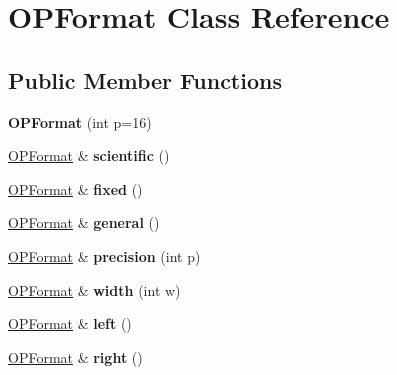 \hypertarget{classOPFormat}{}\section{O\+P\+Format Class Reference}
\label{classOPFormat}
\subsection*{Public Member Functions}
\begin{DoxyCompactItemize}
\item 
\mbox{\label{classOPFormat_a5eccf80a23c37888280f2b7f1f682105}} 
{\bfseries O\+P\+Format} (int p=16)
\item 
\mbox{\label{classOPFormat_a222296f5ecbac5d21f7c63cec2dd7e24}} 
\hyperlink{classOPFormat}{O\+P\+Format} \& {\bfseries scientific} ()
\item 
\mbox{\label{classOPFormat_a6459872d512dbf36edea3a48bb61fbb3}} 
\hyperlink{classOPFormat}{O\+P\+Format} \& {\bfseries fixed} ()
\item 
\mbox{\label{classOPFormat_af07b7c21dfb7038e7b7d33fa35c4ada9}} 
\hyperlink{classOPFormat}{O\+P\+Format} \& {\bfseries general} ()
\item 
\mbox{\label{classOPFormat_ae8bbc8f68aad716450a5c09b6a43d50b}} 
\hyperlink{classOPFormat}{O\+P\+Format} \& {\bfseries precision} (int p)
\item 
\mbox{\label{classOPFormat_af2c9ddba9723a455c1a29de5dd3293a8}} 
\hyperlink{classOPFormat}{O\+P\+Format} \& {\bfseries width} (int w)
\item 
\mbox{\label{classOPFormat_a06eddce39d5e2c37ef77572a906162d0}} 
\hyperlink{classOPFormat}{O\+P\+Format} \& {\bfseries left} ()
\item 
\mbox{\label{classOPFormat_ac066983d5d45b3e0f367cc461ac3b8ef}} 
\hyperlink{classOPFormat}{O\+P\+Format} \& {\bfseries right} ()
\item 
\mbox{\label{classOPFormat_a780e02206bf63b958040541601e3092e}} 

\end{DoxyCompactItemize}

